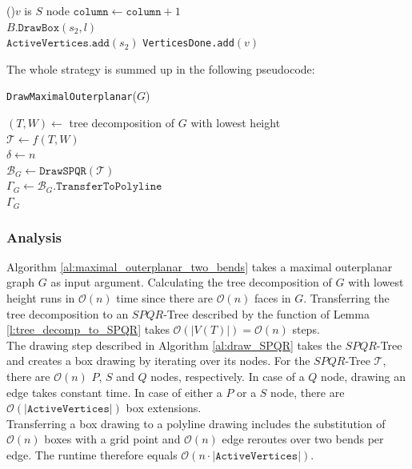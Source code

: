 \begin{algorithm}[H]
{{		}
		\ElseIf(){$v$ is $S$ node}{
			$\texttt{column} \gets \texttt{column}+1$\\
			$B\texttt{.DrawBox}(s_2, l)$\\
			$\texttt{ActiveVertices.add}(s_2)$
		}
		\texttt{VerticesDone.add}$(v)$
	}
\end{algorithm}
The whole strategy is summed up in the following pseudocode:\\
\begin{algorithm}[H]
	\caption{\texttt{DrawMaximalOuterplanar}($G$)}\label{al:maximal_outerplanar_two_bends}
	$(T,W) \gets$ tree decomposition of $G$ with lowest height\\
	$\mathcal{T} \gets f(T,W)$\\
	$\delta \gets n$\\
	$\mathcal{B}_{G} \gets \texttt{DrawSPQR}(\mathcal{T})$\\
	$\Gamma_{G} \gets \mathcal{B}_{G}.\texttt{TransferToPolyline}$\\
	\Return $\Gamma_{G}$
\end{algorithm}

\subsubsection{Analysis}

Algorithm \ref{al:maximal_outerplanar_two_bends} takes a maximal outerplanar graph $G$ as input argument. Calculating the tree decomposition of $G$ with lowest height runs in $\mathcal{O}(n)$ time since there are $\mathcal{O}(n)$ faces in $G$. Transferring the tree decomposition to an $SPQR$-Tree described by the function of Lemma \ref{l:tree_decomp_to_SPQR} takes $\mathcal{O}(|V(T)|) = \mathcal{O}(n)$ steps.\\
The drawing step described in Algorithm \ref{al:draw_SPQR} takes the $SPQR$-Tree and creates a box drawing by iterating over its nodes. For the $SPQR$-Tree $\mathcal{T}$, there are $\mathcal{O}(n)$ $P$, $S$ and $Q$ nodes, respectively. In case of a $Q$ node, drawing an edge takes constant time. In case of either a $P$ or a $S$ node, there are $\mathcal{O}(|\texttt{ActiveVertices}|)$ box extensions.\\
Transferring a box drawing to a polyline drawing includes the substitution of $\mathcal{O}(n)$ boxes with a grid point and $\mathcal{O}(n)$ edge reroutes over two bends per edge. The runtime therefore equals $\mathcal{O}(n\cdot |\texttt{ActiveVertices}|)$.


